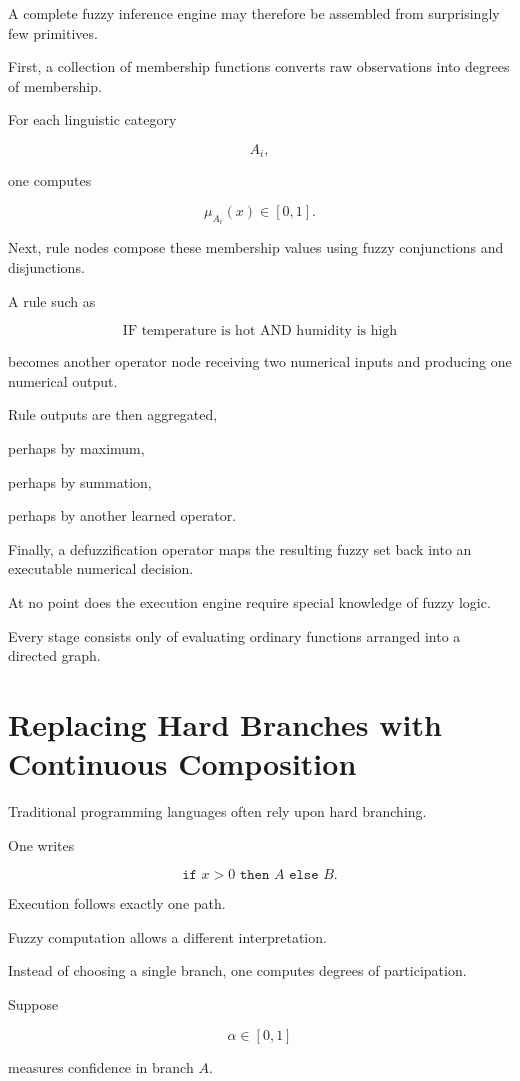 \documentclass[12pt,oneside]{article}
\begin{document}
A complete fuzzy inference engine may therefore be assembled from surprisingly few primitives.

First, a collection of membership functions converts raw observations into degrees of membership.

For each linguistic category

\[
A_i,
\]

one computes

\[
\mu_{A_i}(x)\in[0,1].
\]

Next, rule nodes compose these membership values using fuzzy conjunctions and disjunctions.

A rule such as

\[
\text{IF temperature is hot AND humidity is high}
\]

becomes another operator node receiving two numerical inputs and producing one numerical output.

Rule outputs are then aggregated,

perhaps by maximum,

perhaps by summation,

perhaps by another learned operator.

Finally, a defuzzification operator maps the resulting fuzzy set back into an executable numerical decision.

At no point does the execution engine require special knowledge of fuzzy logic.

Every stage consists only of evaluating ordinary functions arranged into a directed graph.

\section{Replacing Hard Branches with Continuous Composition}

Traditional programming languages often rely upon hard branching.

One writes

\[
\texttt{if }x>0\texttt{ then }A\texttt{ else }B.
\]

Execution follows exactly one path.

Fuzzy computation allows a different interpretation.

Instead of choosing a single branch, one computes degrees of participation.

Suppose

\[
\alpha\in[0,1]
\]

measures confidence in branch \(A\).
\end{document}
